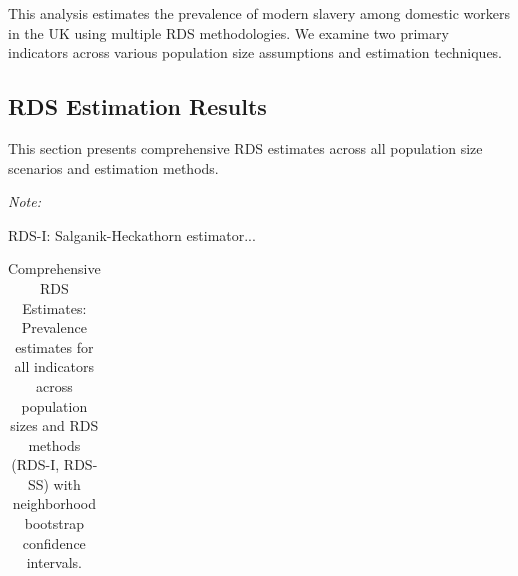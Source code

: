 \documentclass[
  12pt,
  letterpaper,
  DIV=11,
  numbers=noendperiod]{scrartcl}
\theoremstyle{plain}
\theoremstyle{definition}
\begin{document}
This analysis estimates the prevalence of modern slavery among domestic
workers in the UK using multiple RDS methodologies. We examine two
primary indicators across various population size assumptions and
estimation techniques.

\subsection{RDS Estimation Results}\label{rds-estimation-results}

This section presents comprehensive RDS estimates across all population
size scenarios and estimation methods.

\begingroup\fontsize{8}{10}\selectfont

\begin{ThreePartTable}
\begin{TableNotes}[para]
\item \textit{Note:} 
\item RDS-I: Salganik-Heckathorn estimator...
\end{TableNotes}

\begin{longtable}[t]{>{}lcccccccc}

\caption{\label{tbl-rds-comprehensive}Comprehensive RDS Estimates:
Prevalence estimates for all indicators across population sizes and RDS
methods (RDS-I, RDS-SS) with neighborhood bootstrap confidence
intervals.}

\tabularnewline


\end{longtable}
\end{ThreePartTable}
\end{document}
